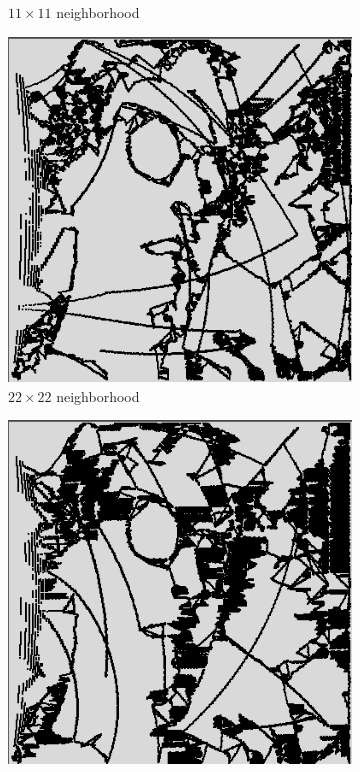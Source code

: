 \begin{figure}[t]
\begin{subfigure}[t]{.15\textwidth}
        \caption{$11\times11$ neighborhood}
        \label{subfig:11x11}
    \end{subfigure}
    \begin{subfigure}[t]{.15\textwidth}
        \includegraphics[width=\textwidth]{Images/segmented_v6_22x22_neighborhood.png}
        \caption{$22\times22$ neighborhood}
        \label{subfig:22x22}
    \end{subfigure}
    \begin{subfigure}[t]{.15\textwidth}
        \includegraphics[width=\textwidth]{Images/segmented_v7_47x47_neighborhood.png}

\end{subfigure}
\end{figure}
